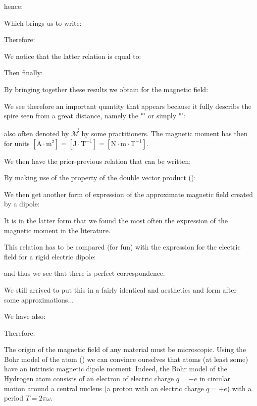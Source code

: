 	hence:
	
	Which brings us to write:
	
	Therefore:
	
	We notice that the latter relation is equal to:
	
	Then finally:
	
	By bringing together these results we obtain for the magnetic field:
	
	We see therefore an important quantity that appears because it fully describs the spire seen from a great distance, namely the "\label{magnetic local dipole moment}" or simply "":
	
	also often denoted by $\vec{\mathcal{M}}$ by some practitioners. The magnetic moment has then for units $[\text{A}\cdot\text{m}^2]=[\text{J}\cdot\text{T}^{-1}]=[\text{N}\cdot\text{m}\cdot \text{T}^{-1}]$. 
	
	We then have the prior-previous relation that can be written:
	
	By making use of the property of the double vector product ():
	
	We then get another form of expression of the approximate magnetic field created by a dipole:
	
	It is in the latter form that we found the most often the expression of the magnetic moment in the literature.
	
	This relation has to be compared (for fun) with the expression for the electric field for a rigid electric dipole:
	
	and thus we see that there is perfect correspondence.
	
	We still arrived to put this in a fairly identical and aesthetics and form after some approximations...

	We have also:
	
	Therefore:
	
	The origin of the magnetic field of any material must be microscopic. Using the Bohr model of the atom () we can convince ourselves that atoms (at least some) have an intrinsic magnetic dipole moment. Indeed, the Bohr model of the Hydrogen atom consists of an electron of electric charge $q=-e$ in circular motion around a central nucleus (a proton with an electric charge $q=+e$) with a period $T=2\pi\omega$.
	
